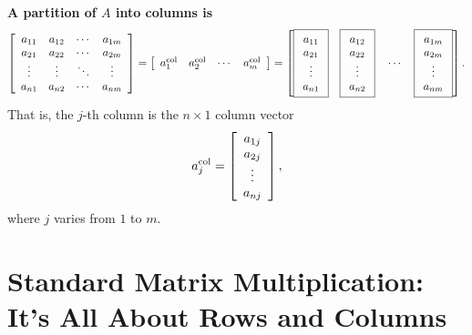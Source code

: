 \textbf{A partition of $A$ into columns is} 
$$ \left[\begin{array}{cccc} a_{11}& a_{12}& \cdots & a_{1m} \\
 a_{21}& a_{22}& \cdots & a_{2m}  \\
 \vdots & \vdots&  \ddots & \vdots \\
 a_{n1}& a_{n2}& \cdots & a_{nm} 
 \end{array}\right] =
\left[\begin{array}{cccc} a_1^{\rm col} & a_2^{\rm col} & \cdots & a_m^{\rm col}\end{array}\right]  = \left[ \boxed{\begin{array}{c} a_{11} \\ a_{21}\\ \vdots \\ a_{n1}\end{array} }~~~
\boxed{\begin{array}{c} a_{12} \\ a_{22}\\ \vdots \\ a_{n2}\end{array} }~~~\cdots~~~
\boxed{\begin{array}{c} a_{1m} \\ a_{2m}\\ \vdots \\ a_{nm}\end{array} }\right].
$$
That is, the $j$-th column is the $n \times 1$ column vector
$$a_j^{\rm col} =\left[ \begin{array}{c} a_{1j} \\ a_{2j}\\ \vdots \\ a_{nj}\end{array} \right], $$
where $j$ varies from $1$ to $m$.\\




\section{Standard Matrix Multiplication: It's All About Rows and Columns}
\label{sec:StandardMatrixMultiplication}

